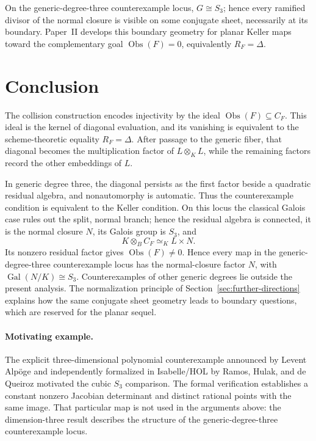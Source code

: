 \documentclass[11pt]{article}
\theoremstyle{remark}
\DeclareMathOperator{\Gal}{Gal}
\newcommand{\Obs}{\operatorname{Obs}}
\begin{document}
On the generic-degree-three counterexample locus, \(G\cong S_3\); hence
every ramified divisor of the normal closure is visible on some conjugate
sheet, necessarily at its boundary.  Paper~II develops this boundary
geometry for planar Keller maps toward the complementary goal
\(\Obs(F)=0\), equivalently \(R_F=\Delta\).

\section{Conclusion}
\label{sec:conclusion}

The collision construction encodes injectivity by the ideal
\(\Obs(F)\subseteq C_F\).  This ideal is the kernel of diagonal evaluation,
and its vanishing is equivalent to the scheme-theoretic equality
\(R_F=\Delta\).
After passage to the generic fiber, that diagonal becomes the
multiplication factor of \(L\otimes_KL\), while the remaining factors
record the other embeddings of \(L\).

In generic degree three, the diagonal persists as the first factor beside
a quadratic residual algebra, and nonautomorphy is automatic.  Thus the
counterexample condition is equivalent to the Keller condition.  On this
locus the classical Galois case rules out the split, normal branch; hence
the residual algebra is connected, it is the normal closure \(N\), its
Galois group is \(S_3\), and
\[
  K\otimes_BC_F\simeq_K L\times N.
\]
Its nonzero residual factor gives \(\Obs(F)\neq0\).  Hence every map in
the generic-degree-three counterexample locus has the normal-closure factor
\(N\), with \(\Gal(N/K)\cong S_3\).  Counterexamples of other generic degrees
lie outside the present analysis.  The normalization principle
of Section~\ref{sec:further-directions} explains how the same conjugate
sheet geometry leads to boundary questions, which are reserved for the
planar sequel.

\paragraph{Motivating example.}
The explicit three-dimensional polynomial counterexample announced by
Levent Alpöge \cite{Alpoge2026} and independently formalized in
Isabelle/HOL by Ramos, Hulak, and de Queiroz
\cite{AFPJacobianCounterexample} motivated the cubic \(S_3\) comparison.
The formal verification establishes a
constant nonzero Jacobian determinant and distinct rational points with
the same image.  That particular map is not used in the arguments above:
the dimension-three result describes the structure of the
generic-degree-three counterexample locus.
\end{document}
